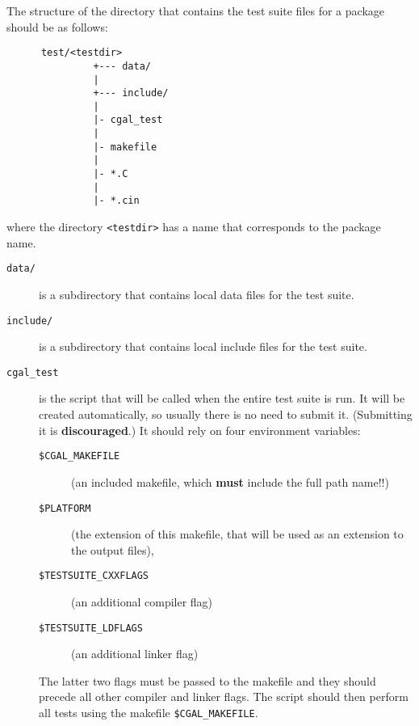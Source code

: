 The structure of the directory that contains the test suite files for 
a package should be as follows: 

\begin{verbatim}
      test/<testdir>
               +--- data/
               |
               +--- include/
               |
               |- cgal_test
               |
               |- makefile
               |
               |- *.C
               |
               |- *.cin
\end{verbatim}
where the directory \verb|<testdir>| has a name that corresponds to the package
name.

\begin{description}
   \item[{\tt data/}] is a subdirectory that contains local data files for the
        test suite.
   \item[{\tt include/}] is a subdirectory that contains local include files for
        the test suite.
   \item[{\tt cgal\_test}]
        is the script that will be called when the entire
        test suite is run. It will be created automatically, so usually there
        is no need to submit it. (Submitting it is {\bf discouraged}.)
        It should rely on four environment variables:
        \begin{description}
            \item[{\tt \$CGAL\_MAKEFILE}]%
                 (an included makefile, which {\bf must} include the full path
                  name!!) 
            \item[{\tt \$PLATFORM}]%
                 (the extension of this makefile, that will 
                 be used as an extension to the output files), 
            \item[{\tt \$TESTSUITE\_CXXFLAGS}]%
                 (an additional compiler flag) 
            \item[{\tt \$TESTSUITE\_LDFLAGS}] 
                 (an additional linker flag) 
        \end{description}
        The latter two flags must be passed to the makefile%
        and they should 
        precede all other compiler and linker flags. The script should then
        perform all tests using the makefile \verb|$CGAL_MAKEFILE|. 


\end{description}
